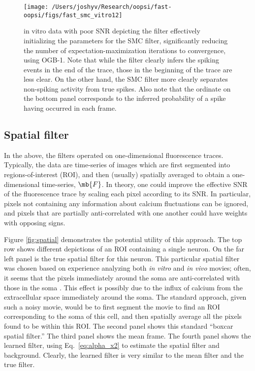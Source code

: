 \begin{figure}[h!]
\centering \texttt{[image: /Users/joshyv/Research/oopsi/fast-oopsi/figs/fast\_smc\_vitro12]}
\caption[\foopsi filter can initialize Wiener filter]{in vitro data with poor SNR depicting the \foopsi filter effectively initializing the parameters for the SMC filter, significantly reducing the number of expectation-maximization iterations to convergence, using OGB-1.  Note that while the \foopsi filter clearly infers the spiking events in the end of the trace, those in the beginning of the trace are less clear.  On the other hand, the SMC filter more clearly separates non-spiking activity from true spikes.  Also note that the ordinate on the bottom panel corresponds to the inferred probability of a spike having occurred in each frame.} \label{fig:smc_init}
\end{figure}

\subsection{Spatial filter} \label{sec:results:spatial}

In the above, the filters operated on one-dimensional fluorescence traces. Typically, the data are time-series of images which are first segmented into regions-of-interest (ROI), and then (usually) spatially averaged to obtain a one-dimensional time-series, $\mb{F}$.  In theory, one could improve the effective SNR of the fluorescence trace by scaling each pixel according to its SNR.  In particular, pixels not containing any information about calcium fluctuations can be ignored, and pixels that are partially anti-correlated with one another could have weights with opposing signs.  

Figure \ref{fig:spatial} demonstrates the potential utility of this approach.  The top row shows different depictions of an ROI containing a single neuron.  On the far left panel is the true spatial filter for this neuron.  This particular spatial filter was chosen based on experience analyzing both \emph{in vitro} and \emph{in vivo} movies; often, it seems that the pixels immediately around the soma are anti-correlated with those in the soma \cite{MacLeanYuste05,WatsonYuste08}.  This effect is possibly due to the influx of calcium from the extracellular space immediately around the soma.   The standard approach, given such a noisy movie, would be to first segment the movie to find an ROI corresponding to the soma of this cell, and then spatially average all the pixels found to be within this ROI.  The second panel shows this standard ``boxcar spatial filter.''  The third panel shows the mean frame. The fourth panel shows the learned filter, using Eq.~\eqref{eq:alpha_x2} to estimate the spatial filter and background. Clearly, the learned filter is very similar to the mean filter and the true filter. 


